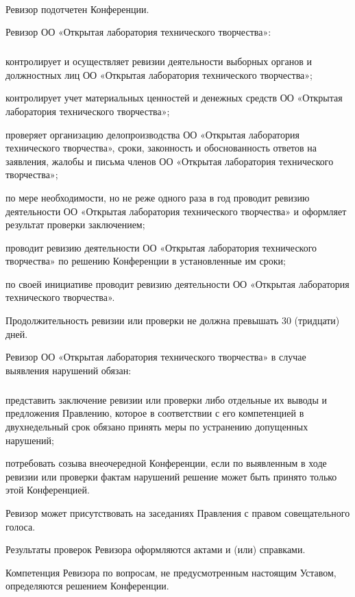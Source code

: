 \documentclass[a4paper,fontsize=14pt,titlepage]{scrartcl}
\makeatletter
\newenvironment{numberedpars}{%
  \addtocounter{secnumdepth}{1}
  \renewcommand\theparagraph{\arabic{section}.\arabic{paragraph}}
  \renewcommand\@seccntformat[1]
  {\expandafter\ifx\csname##1\endcsname\paragraph\csname 
  the##1\endcsname\else\csname the##1\endcsname\quad\fi}
  \let\old@par=\par
  \def\new@par{\let\par=\old@par\paragraph{}\let\par=\new@par}
  \let\par=\new@par
  \par
}{
  \addtocounter{secnumdepth}{-1}
}
\newenvironment{numberedsubpars}{%
  \addtocounter{secnumdepth}{1}
  \renewcommand\thesubparagraph{\arabic{section}.\arabic{paragraph}.\arabic{subparagraph}}
  \renewcommand\@seccntformat[1]
  {\expandafter\ifx\csname##1\endcsname\subparagraph\csname 
  the##1\endcsname\else\csname the##1\endcsname\quad\fi}
  \let\old@@par=\par
  \def\new@@par{\let\par=\old@par\subparagraph{}\let\par=\new@@par}
  \let\par=\new@@par
  \par
}{
  \addtocounter{secnumdepth}{-1}
  \let\par=\old@@par
}
\makeatother
\begin{document}
\begin{numberedpars}
Ревизор подотчетен Конференции.

Ревизор ОО «Открытая лаборатория технического творчества»:
\begin{numberedsubpars}
контролирует и осуществляет ревизии деятельности выборных органов и должностных лиц ОО «Открытая лаборатория
технического творчества»;

контролирует учет материальных ценностей и денежных средств ОО «Открытая лаборатория технического творчества»;

проверяет организацию делопроизводства ОО «Открытая лаборатория технического творчества», сроки, законность и
обоснованность ответов на заявления, жалобы и письма членов ОО «Открытая лаборатория технического творчества»;

по мере необходимости, но не реже одного раза в год проводит ревизию деятельности ОО «Открытая лаборатория технического
творчества» и оформляет результат проверки заключением;

проводит ревизию деятельности ОО «Открытая лаборатория технического творчества» по решению Конференции в установленные
им сроки;

по своей инициативе проводит ревизию деятельности ОО «Открытая лаборатория технического творчества».
\end{numberedsubpars}

Продолжительность ревизии или проверки не должна превышать 30 (тридцати) дней.

Ревизор ОО «Открытая лаборатория технического творчества» в случае выявления нарушений обязан:
\begin{numberedsubpars}
представить заключение ревизии или проверки либо отдельные их выводы и предложения Правлению, которое в соответствии с
его компетенцией в двухнедельный срок обязано принять меры по устранению допущенных нарушений;

потребовать созыва внеочередной Конференции, если по выявленным в ходе ревизии или проверки фактам нарушений решение
может быть принято только этой Конференцией.
\end{numberedsubpars}

Ревизор может присутствовать на заседаниях Правления с правом совещательного голоса.

Результаты проверок Ревизора оформляются актами и (или) справками.

Компетенция Ревизора по вопросам, не предусмотренным настоящим Уставом, определяются решением Конференции.
\end{numberedpars}
\end{document}
